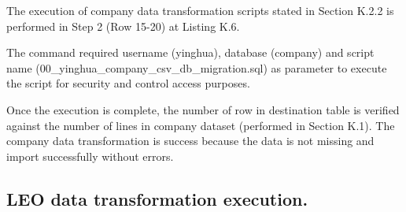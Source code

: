 The execution of company data transformation scripts stated in Section K.2.2 is performed in Step 2 (Row 15-20) at Listing K.6. 

The command required username (yinghua), database (company) and script name (00\_yinghua\_company\_csv\_db\_migration.sql) as parameter to execute the script for security and control access purposes. 

Once the execution is complete, the number of row in destination table is verified against the number of lines in company dataset (performed in Section K.1). The company data transformation is success because the data is not missing and import successfully without errors. 

\newpage

\subsection{LEO data transformation execution.}

